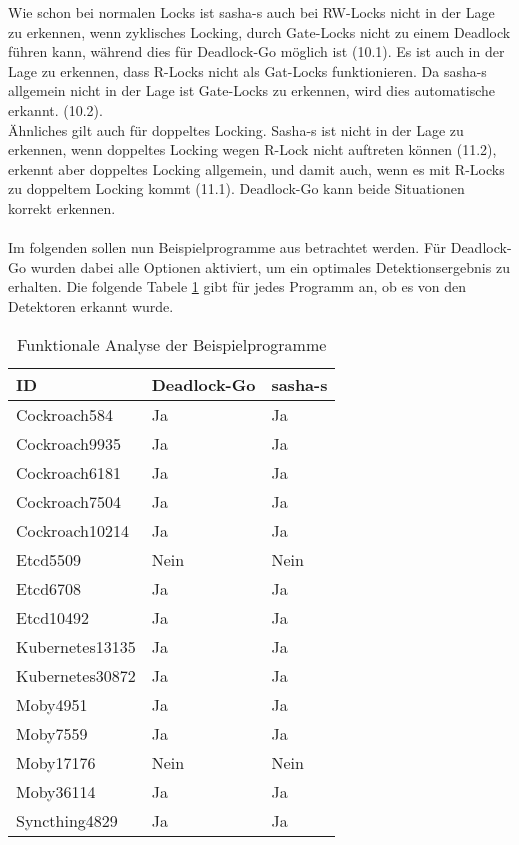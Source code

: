 Wie schon bei normalen Locks ist sasha-s auch bei RW-Locks nicht in der Lage 
zu erkennen, wenn zyklisches Locking, durch Gate-Locks nicht zu einem Deadlock 
führen kann, während dies für Deadlock-Go möglich ist (10.1). Es ist auch in der Lage 
zu erkennen, dass R-Locks nicht als Gat-Locks funktionieren. Da sasha-s allgemein 
nicht in der Lage ist Gate-Locks zu erkennen, wird dies automatische erkannt. (10.2).\\
Ähnliches gilt auch für doppeltes Locking. Sasha-s ist 
nicht in der Lage zu erkennen, wenn doppeltes Locking wegen R-Lock nicht auftreten 
können (11.2), erkennt aber doppeltes Locking allgemein, und damit auch, wenn 
es mit R-Locks zu doppeltem Locking kommt (11.1). Deadlock-Go kann beide Situationen
korrekt erkennen.
\\\\
Im folgenden sollen nun Beispielprogramme aus \cite{implementation} 
betrachtet werden. Für Deadlock-Go wurden dabei alle Optionen aktiviert, um ein 
optimales Detektionsergebnis zu erhalten.
Die folgende Tabele \ref{Tab::Analyse:Functional.Example} gibt für jedes Programm an,
 ob es von den Detektoren erkannt wurde.
\begin{table}[H]
\centering
\begin{tabular}{|l|l|l|}
\hline
\textbf{ID} & \textbf{Deadlock-Go} & \textbf{sasha-s} \\ \hline
Cockroach584 & Ja & Ja \\ \hline
Cockroach9935 & Ja & Ja \\ \hline
Cockroach6181 & Ja & Ja \\ \hline
Cockroach7504 & Ja & Ja \\ \hline
Cockroach10214 & Ja & Ja \\ \hline
Etcd5509 & Nein & Nein \\ \hline
Etcd6708 & Ja & Ja \\ \hline
Etcd10492 & Ja & Ja \\ \hline
Kubernetes13135 & Ja & Ja \\ \hline
Kubernetes30872 & Ja & Ja \\ \hline
Moby4951 & Ja & Ja \\ \hline
Moby7559 & Ja & Ja \\ \hline
Moby17176 & Nein & Nein \\ \hline
Moby36114 & Ja & Ja \\ \hline
Syncthing4829 & Ja & Ja \\ \hline
\end{tabular}
\caption{Funktionale Analyse der Beispielprogramme}
\label{Tab::Analyse:Functional.Example}
\end{table}
